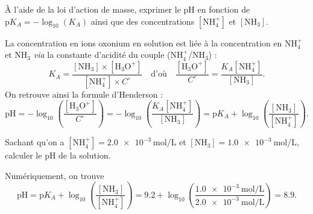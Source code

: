 

\begin{enonce}
À l'aide de la loi d'action de masse, exprimer le pH en fonction de $\mathrm{p}K_A=-\log_{10}(K_A)$  ainsi que des concentrations $\mathrm{[NH_4^+]}$ et $\mathrm{[NH_3]}$. 
\minusMedskip

\end{enonce}


\begin{corrigeNewpage}
La concentration en ions oxonium en solution est liée à la concentration en NH$^+_4$ et NH$_3$ \emph{via} la constante d'acidité du couple (NH$^+_4$/NH$_3$) : 
\[
K_A=\frac{[\text{NH}_3]\times[\text{H}_3\text{O}^+]}{[\text{NH}^+_4]\times C^\circ}\quad\text{d'où}\quad
\frac{[\text{H}_3\text{O}^+]}{C^\circ}=\frac{K_A [\text{NH}^+_4]}{[\text{NH}_3]}.
\]
On retrouve ainsi la formule d'Henderson : 
\[
\text{pH}=-\log_{10}\left(\frac{[\text{H}_3\text{O}^+]}{C^\circ}\right)=-\log_{10}\left(\frac{K_A[\text{NH}^+_4]}{[\text{NH}_3]}\right)=
\text{p}K_A+\log_{10}\left(\frac{[\text{NH}_3]}{ [\text{NH}^+_4]}\right).
\]
\end{corrigeNewpage}




\begin{enonce}
Sachant qu'on a $\mathrm{[NH_4^+]}=\SI{2,0e-3}{\mole\per\liter}$ et $\mathrm{[NH_3]}=\SI{1,0e-3}{\mole\per\liter}$, calculer le pH de la solution.

\end{enonce}
\begin{corrige}
Numériquement, on trouve 
\[
\text{pH}=\text{p}K_A+\log_{10}\left(\frac{[\text{NH}_3]}{ [\text{NH}^+_4]}\right)=
\num{9.2}+\log_{10}\left(\frac{\SI{1,0e-3}{\mole\per\liter}}{\SI{2,0e-3}{\mole\per\liter}}\right)=
\num{8,9}.
\]
\end{corrige}




\finEntrainement




